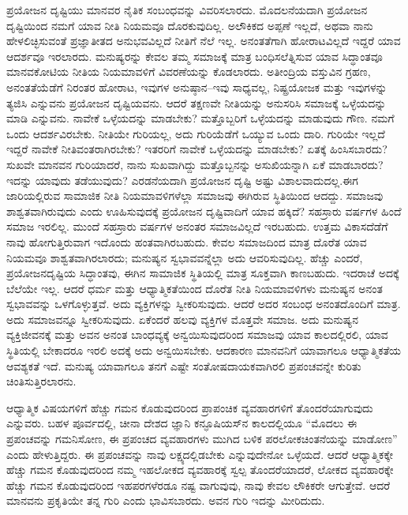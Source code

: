 ಪ್ರಯೋಜನ ದೃಷ್ಟಿಯು ಮಾನವರ ನೈತಿಕ ಸಂಬಂಧವನ್ನು ವಿವರಿಸಲಾರದು. ಮೊದಲನೆಯದಾಗಿ ಪ್ರಯೋಜನ ದೃಷ್ಟಿಯಿಂದ ನಮಗೆ ಯಾವ ನೀತಿ ನಿಯಮವೂ ದೊರಕುವುದಿಲ್ಲ. ಅಲೌಕಿಕದ ಅಪ್ಪಣೆ ಇಲ್ಲದೆ, ಅಥವಾ ನಾನು ಹೇಳಲಿಚ್ಛಿಸುವಂತೆ ಪ್ರಜ್ಞಾತೀತದ ಅನುಭವವಿಲ್ಲದೆ ನೀತಿಗೆ ನೆಲೆ ಇಲ್ಲ. ಅನಂತತೆಗಾಗಿ ಹೋರಾಟವಿಲ್ಲದೆ ಇದ್ದರೆ ಯಾವ ಆದರ್ಶವೂ ಇರಲಾರದು. ಮನುಷ್ಯರನ್ನು ಕೇವಲ ತಮ್ಮ ಸಮಾಜಕ್ಕೆ ಮಾತ್ರ ಬಂಧಿಸಲೆತ್ನಿಸುವ ಯಾವ ಸಿದ್ಧಾಂತವೂ ಮಾನವಕೋಟಿಯ ನೀತಿಯ ನಿಯಮಾವಳಿಗೆ ವಿವರಣೆಯನ್ನು ಕೊಡಲಾರದು. ಅತೀಂದ್ರಿಯ ವಸ್ತುವಿನ ಗ್ರಹಣ, ಅನಂತತೆಯೆಡೆಗೆ ನಿರಂತರ ಹೋರಾಟ, ಇವುಗಳ ಅನುಷ್ಠಾನ–ಇವು ಸಾಧ್ಯವಲ್ಲ, ನಿಷ್ಪ್ರಯೋಜಕ ಮತ್ತು ಇವುಗಳನ್ನು ತ್ಯಜಿಸಿ ಎನ್ನುವನು ಪ್ರಯೋಜನ ದೃಷ್ಟಿಯವನು. ಆದರೆ ತಕ್ಷಣವೇ ನೀತಿಯನ್ನು ಅನುಸರಿಸಿ ಸಮಾಜಕ್ಕೆ ಒಳ್ಳೆಯದನ್ನು ಮಾಡಿ ಎನ್ನುವನು. ನಾವೇಕೆ ಒಳ್ಳೆಯದನ್ನು ಮಾಡಬೇಕು? ಮತ್ತೊಬ್ಬರಿಗೆ ಒಳ್ಳೆಯದನ್ನು ಮಾಡುವುದು ಗೌಣ. ನಮಗೆ ಒಂದು ಆದರ್ಶವಿರಬೇಕು. ನೀತಿಯೇ ಗುರಿಯಲ್ಲ, ಅದು ಗುರಿಯೆಡೆಗೆ ಒಯ್ಯುವ ಒಂದು ದಾರಿ. ಗುರಿಯೇ ಇಲ್ಲದೆ ಇದ್ದರೆ ನಾವೇಕೆ ನೀತಿವಂತರಾಗಿರಬೇಕು? ಇತರರಿಗೆ ನಾವೇಕೆ ಒಳ್ಳೆಯದನ್ನು ಮಾಡಬೇಕು? ಏತಕ್ಕೆ ಹಿಂಸಿಸಬಾರದು? ಸುಖವೇ ಮಾನವನ ಗುರಿಯಾದರೆ, ನಾನು ಸುಖವಾಗಿದ್ದು ಮತ್ತೊಬ್ಬನನ್ನು ಅಸುಖಿಯನ್ನಾಗಿ ಏಕೆ ಮಾಡಬಾರದು? ಇದನ್ನು ಯಾವುದು ತಡೆಯುವುದು? ಎರಡನೆಯದಾಗಿ ಪ್ರಯೋಜನ ದೃಷ್ಟಿ ಅಷ್ಟು ವಿಶಾಲವಾದುದಲ್ಲ.ಈಗ ಜಾರಿಯಲ್ಲಿರುವ ಸಾಮಾಜಿಕ ನೀತಿ ನಿಯಮಾವಳಿಗಳೆಲ್ಲಾ ಸಮಾಜವು ಈಗಿರುವ ಸ್ಥಿತಿಯಿಂದ ಆದದ್ದು. ಸಮಾಜವು ಶಾಶ್ವತವಾಗಿರುವುದು ಎಂದು ಊಹಿಸುವುದಕ್ಕೆ ಪ್ರಯೋಜನ ದೃಷ್ಟಿವಾದಿಗೆ ಯಾವ ಹಕ್ಕಿದೆ? ಸಹಸ್ರಾರು ವರ್ಷಗಳ ಹಿಂದೆ ಸಮಾಜ ಇರಲಿಲ್ಲ. ಮುಂದೆ ಸಹಸ್ರಾರು ವರ್ಷಗಳ ಅನಂತರ ಸಮಾಜವಿಲ್ಲದೆ ಇರಬಹುದು. ಉತ್ತಮ ವಿಕಾಸದೆಡೆಗೆ ನಾವು ಹೋಗುತ್ತಿರುವಾಗ ಇದೊಂದು ಹಂತವಾಗಿರಬಹುದು. ಕೇವಲ ಸಮಾಜದಿಂದ ಮಾತ್ರ ದೊರೆತ ಯಾವ ನಿಯಮವೂ ಶಾಶ್ವತವಾಗಿರಲಾರದು; ಮನುಷ್ಯನ ಸ್ವಭಾವವನ್ನೆಲ್ಲಾ ಅದು ಆವರಿಸುವುದಿಲ್ಲ. ಹೆಚ್ಚು ಎಂದರೆ, ಪ್ರಯೋಜನದೃಷ್ಟಿಯ ಸಿದ್ಧಾಂತವು, ಈಗಿನ ಸಾಮಾಜಿಕ ಸ್ಥಿತಿಯಲ್ಲಿ ಮಾತ್ರ ಸೂಕ್ತವಾಗಿ ಕಾಣಬಹುದು. ಇದರಾಚೆ ಅದಕ್ಕೆ ಬೆಲೆಯೇ ಇಲ್ಲ. ಆದರೆ ಧರ್ಮ ಮತ್ತು ಆಧ್ಯಾತ್ಮಿಕತೆಯಿಂದ ದೊರೆತ ನೀತಿ ನಿಯಮಾವಳಿಗಳು ಮನುಷ್ಯನ ಅನಂತ ಸ್ವಭಾವವನ್ನು ಒಳಗೊಳ್ಳುತ್ತವೆ. ಅದು ವ್ಯಕ್ತಿಗಳನ್ನು ಸ್ವೀಕರಿಸುವುದು. ಆದರೆ ಅದರ ಸಂಬಂಧ ಅನಂತದೊಂದಿಗೆ ಮಾತ್ರ. ಅದು ಸಮಾಜವನ್ನೂ ಸ್ವೀಕರಿಸುವುದು. ಏಕೆಂದರೆ ಹಲವು ವ್ಯಕ್ತಿಗಳ ಮೊತ್ತವೇ ಸಮಾಜ. ಅದು ಮನುಷ್ಯನ ವ್ಯಕ್ತಿಜೀವನಕ್ಕೆ ಮತ್ತು ಅವನ ಅನಂತ ಬಾಂಧವ್ಯಕ್ಕೆ ಅನ್ವಯಿಸುವುದರಿಂದ ಸಮಾಜವು ಯಾವ ಕಾಲದಲ್ಲಿರಲಿ, ಯಾವ ಸ್ಥಿತಿಯಲ್ಲಿ ಬೇಕಾದರೂ ಇರಲಿ ಅದಕ್ಕೆ ಅದು ಅನ್ವಯಿಸಬೇಕು. ಆದಕಾರಣ ಮಾನವನಿಗೆ ಯಾವಾಗಲೂ ಆಧ್ಯಾತ್ಮಿಕತೆಯ ಆವಶ್ಯಕತೆ ಇದೆ. ಮನುಷ್ಯ ಯಾವಾಗಲೂ ತನಗೆ ಎಷ್ಟೇ ಸಂತೋಷದಾಯಕವಾಗಿರಲಿ ಪ್ರಪಂಚವನ್ನೇ ಕುರಿತು ಚಿಂತಿಸುತ್ತಿರಲಾರನು.

ಆಧ್ಯಾತ್ಮಿಕ ವಿಷಯಗಳಿಗೆ ಹೆಚ್ಚು ಗಮನ ಕೊಡುವುದರಿಂದ ಪ್ರಾಪಂಚಿಕ ವ್ಯವಹಾರಗಳಿಗೆ ತೊಂದರೆಯಾಗುವುದು ಎನ್ನುವರು. ಬಹಳ ಪೂರ್ವದಲ್ಲಿ, ಚೀನಾ ದೇಶದ ಜ್ಞಾನಿ ಕನ್ಫೂಷಿಯಸ್​ನ ಕಾಲದಲ್ಲಿಯೂ “ಮೊದಲು ಈ ಪ್ರಪಂಚವನ್ನು ಗಮನಿಸೋಣ, ಈ ಪ್ರಪಂಚದ ವ್ಯವಹಾರಗಳು ಮುಗಿದ ಬಳಿಕ ಪರಲೋಕಚಿಂತನೆಯನ್ನು ಮಾಡೋಣ” ಎಂದು ಹೇಳುತ್ತಿದ್ದರು. ಈ ಪ್ರಪಂಚವನ್ನು ನಾವು ಲಕ್ಷ್ಯದಲ್ಲಿಡಬೇಕು ಎನ್ನುವುದೇನೋ ಒಳ್ಳೆಯದೆ. ಆದರೆ ಆಧ್ಯಾತ್ಮಿಕಕ್ಕೇ ಹೆಚ್ಚು ಗಮನ ಕೊಡುವುದರಿಂದ ನಮ್ಮ ಇಹಲೋಕದ ವ್ಯವಹಾರಕ್ಕೆ ಸ್ವಲ್ಪ ತೊಂದರೆಯಾದರೆ, ಲೋಕದ ವ್ಯವಹಾರಕ್ಕೇ ಹೆಚ್ಚು ಗಮನ ಕೊಡುವುದರಿಂದ ಇಹಪರಗಳೆರಡೂ ನಷ್ಟ ವಾಗುವುವು, ನಾವು ಕೇವಲ ಲೌಕಿಕರೇ ಆಗುತ್ತೇವೆ. ಆದರೆ ಮಾನವನು ಪ್ರಕೃತಿಯೇ ತನ್ನ ಗುರಿ ಎಂದು ಭಾವಿಸಬಾರದು. ಅವನ ಗುರಿ ಇದನ್ನು ಮೀರಿದುದು.

